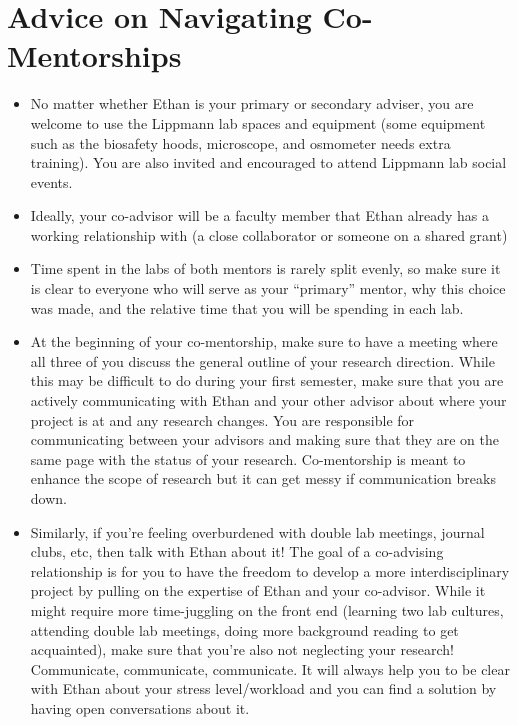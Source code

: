 \documentclass[
]{book}
\begin{document}
\hypertarget{advice-on-navigating-co-mentorships}{%
\section{Advice on Navigating Co-Mentorships}\label{advice-on-navigating-co-mentorships}}

\begin{itemize}
\item
  No matter whether Ethan is your primary or secondary adviser, you are welcome to use the Lippmann lab spaces and equipment (some equipment such as the biosafety hoods, microscope, and osmometer needs extra training). You are also invited and encouraged to attend Lippmann lab social events.
\item
  Ideally, your co-advisor will be a faculty member that Ethan already has a working relationship with (a close collaborator or someone on a shared grant)
\item
  Time spent in the labs of both mentors is rarely split evenly, so make sure it is clear to everyone who will serve as your ``primary'' mentor, why this choice was made, and the relative time that you will be spending in each lab.
\item
  At the beginning of your co-mentorship, make sure to have a meeting where all three of you discuss the general outline of your research direction. While this may be difficult to do during your first semester, make sure that you are actively communicating with Ethan and your other advisor about where your project is at and any research changes. You are responsible for communicating between your advisors and making sure that they are on the same page with the status of your research. Co-mentorship is meant to enhance the scope of research but it can get messy if communication breaks down.
\item
  Similarly, if you're feeling overburdened with double lab meetings, journal clubs, etc, then talk with Ethan about it! The goal of a co-advising relationship is for you to have the freedom to develop a more interdisciplinary project by pulling on the expertise of Ethan and your co-advisor. While it might require more time-juggling on the front end (learning two lab cultures, attending double lab meetings, doing more background reading to get acquainted), make sure that you're also not neglecting your research! Communicate, communicate, communicate. It will always help you to be clear with Ethan about your stress level/workload and you can find a solution by having open conversations about it.
\end{itemize}
\end{document}
